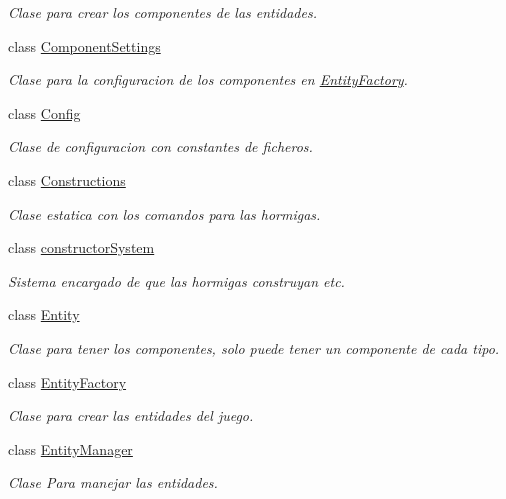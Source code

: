 \begin{DoxyCompactItemize}
\begin{DoxyCompactList}\small\item\em Clase para crear los componentes de las entidades. \end{DoxyCompactList}\item 
class \hyperlink{classant_1_1_component_settings}{Component\+Settings}
\begin{DoxyCompactList}\small\item\em Clase para la configuracion de los componentes en \hyperlink{classant_1_1_entity_factory}{Entity\+Factory}. \end{DoxyCompactList}\item 
class \hyperlink{classant_1_1_config}{Config}
\begin{DoxyCompactList}\small\item\em Clase de configuracion con constantes de ficheros. \end{DoxyCompactList}\item 
class \hyperlink{classant_1_1_constructions}{Constructions}
\begin{DoxyCompactList}\small\item\em Clase estatica con los comandos para las hormigas. \end{DoxyCompactList}\item 
class \hyperlink{classant_1_1constructor_system}{constructor\+System}
\begin{DoxyCompactList}\small\item\em Sistema encargado de que las hormigas construyan etc. \end{DoxyCompactList}\item 
class \hyperlink{classant_1_1_entity}{Entity}
\begin{DoxyCompactList}\small\item\em Clase para tener los componentes, solo puede tener un componente de cada tipo. \end{DoxyCompactList}\item 
class \hyperlink{classant_1_1_entity_factory}{Entity\+Factory}
\begin{DoxyCompactList}\small\item\em Clase para crear las entidades del juego. \end{DoxyCompactList}\item 
class \hyperlink{classant_1_1_entity_manager}{Entity\+Manager}
\begin{DoxyCompactList}\small\item\em Clase Para manejar las entidades. \end{DoxyCompactList}\item 

\end{DoxyCompactItemize}
